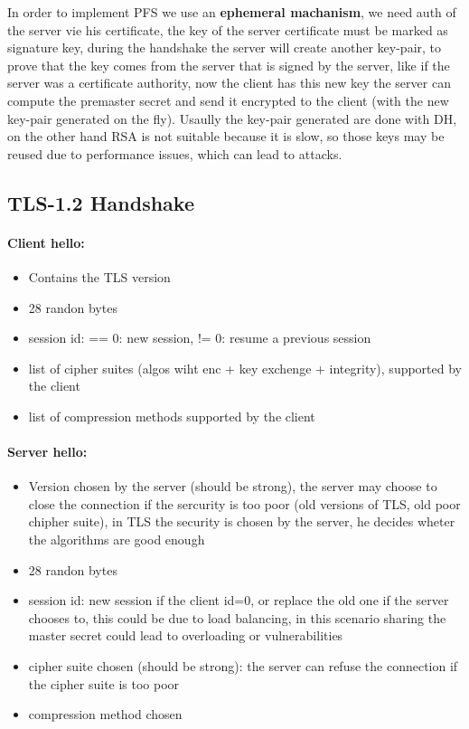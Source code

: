 \documentclass[12pt]{article}
\begin{document}
In order to implement PFS we use an \textbf{ephemeral machanism}, we need auth of the server vie his certificate, the key of the server certificate must be marked as signature key, during the handshake the server will create another key-pair, to prove that the key comes from the server that is signed by the server, like if the server was a certificate authority, now the client has this new key the server can compute the premaster secret and send it encrypted to the client (with the new key-pair generated on the fly). Usaully the key-pair generated are done with DH, on the other hand RSA is not suitable because it is slow, so those keys may be reused due to performance issues, which can lead to attacks.

\subsection{TLS-1.2 Handshake}

\paragraph{Client hello:}
\begin{itemize}
  \item Contains the TLS version
  \item 28 randon bytes
  \item session id: == 0: new session, != 0: resume a previous session
  \item list of cipher suites (algos wiht enc + key exchenge + integrity), supported by the client
  \item list of compression methods supported by the client
\end{itemize}



\paragraph{Server hello:}
\begin{itemize}
  \item Version chosen by the server (should be strong), the server may choose to close the connection if the sercurity is too poor (old versions of TLS, old poor chipher suite), in TLS the security is chosen by the server, he decides wheter the algorithms are good enough
  \item 28 randon bytes
  \item session id: new session if the client id=0, or replace the old one if the server chooses to, this could be due to load balancing, in this scenario sharing the master secret could lead to overloading or vulnerabilities
  \item cipher suite chosen (should be strong): the server can refuse the connection if the cipher suite is too poor
  \item compression method chosen
\end{itemize}
\end{document}

